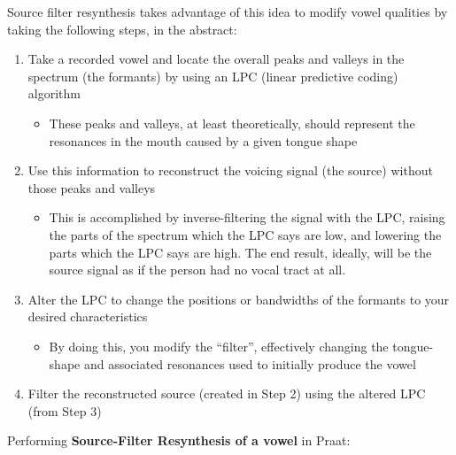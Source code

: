 Source filter resynthesis takes advantage of this idea to modify vowel
qualities by taking the following steps, in the abstract:

\begin{enumerate}
\def\labelenumi{\arabic{enumi}.}
\tightlist
\item
  Take a recorded vowel and locate the overall peaks and valleys in the
  spectrum (the formants) by using an LPC (linear predictive coding)
  algorithm

  \begin{itemize}
  \tightlist
  \item
    These peaks and valleys, at least theoretically, should represent
    the resonances in the mouth caused by a given tongue shape
  \end{itemize}
\item
  Use this information to reconstruct the voicing signal (the source)
  without those peaks and valleys

  \begin{itemize}
  \tightlist
  \item
    This is accomplished by inverse-filtering the signal with the LPC,
    raising the parts of the spectrum which the LPC says are low, and
    lowering the parts which the LPC says are high. The end result,
    ideally, will be the source signal as if the person had no vocal
    tract at all.
  \end{itemize}
\item
  Alter the LPC to change the positions or bandwidths of the formants to
  your desired characteristics

  \begin{itemize}
  \tightlist
  \item
    By doing this, you modify the ``filter'', effectively changing the
    tongue-shape and associated resonances used to initially produce the
    vowel
  \end{itemize}
\item
  Filter the reconstructed source (created in Step 2) using the altered
  LPC (from Step 3)
\end{enumerate}

Performing \textbf{Source-Filter Resynthesis of a vowel} in Praat:

